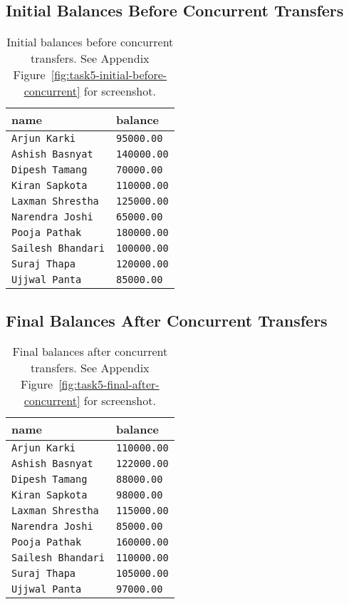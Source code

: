 \subsection{Initial Balances Before Concurrent Transfers}
\begin{table}[H]
  \centering
  \begin{tabular}{|l|l|}
    \hline
    \textbf{name} & \textbf{balance} \\
    \hline
    \texttt{Arjun Karki} & \texttt{95000.00} \\
    \texttt{Ashish Basnyat} & \texttt{140000.00} \\
    \texttt{Dipesh Tamang} & \texttt{70000.00} \\
    \texttt{Kiran Sapkota} & \texttt{110000.00} \\
    \texttt{Laxman Shrestha} & \texttt{125000.00} \\
    \texttt{Narendra Joshi} & \texttt{65000.00} \\
    \texttt{Pooja Pathak} & \texttt{180000.00} \\
    \texttt{Sailesh Bhandari} & \texttt{100000.00} \\
    \texttt{Suraj Thapa} & \texttt{120000.00} \\
    \texttt{Ujjwal Panta} & \texttt{85000.00} \\
    \hline
  \end{tabular}
  \caption{Initial balances before concurrent transfers. See Appendix Figure~\ref{fig:task5-initial-before-concurrent} for screenshot.}
\end{table}

\subsection{Final Balances After Concurrent Transfers}
\begin{table}[H]
  \centering
  \begin{tabular}{|l|l|}
    \hline
    \textbf{name} & \textbf{balance} \\
    \hline
    \texttt{Arjun Karki} & \texttt{110000.00} \\
    \texttt{Ashish Basnyat} & \texttt{122000.00} \\
    \texttt{Dipesh Tamang} & \texttt{88000.00} \\
    \texttt{Kiran Sapkota} & \texttt{98000.00} \\
    \texttt{Laxman Shrestha} & \texttt{115000.00} \\
    \texttt{Narendra Joshi} & \texttt{85000.00} \\
    \texttt{Pooja Pathak} & \texttt{160000.00} \\
    \texttt{Sailesh Bhandari} & \texttt{110000.00} \\
    \texttt{Suraj Thapa} & \texttt{105000.00} \\
    \texttt{Ujjwal Panta} & \texttt{97000.00} \\
    \hline
  \end{tabular}
  \caption{Final balances after concurrent transfers. See Appendix Figure~\ref{fig:task5-final-after-concurrent} for screenshot.}
\end{table}

